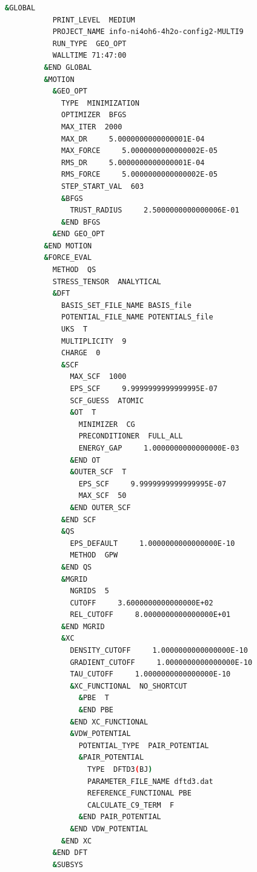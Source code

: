 \documentclass[12pt]{article}
\begin{document}
\begin{center}
    \lstset{numbers=left, basicstyle=\ttfamily, numbersep=-45pt}
    \begin{lstlisting}[language=bash]
        &GLOBAL
           PRINT_LEVEL  MEDIUM
           PROJECT_NAME info-ni4oh6-4h2o-config2-MULTI9
           RUN_TYPE  GEO_OPT
           WALLTIME 71:47:00
         &END GLOBAL
         &MOTION
           &GEO_OPT
             TYPE  MINIMIZATION
             OPTIMIZER  BFGS
             MAX_ITER  2000
             MAX_DR     5.0000000000000001E-04
             MAX_FORCE     5.0000000000000002E-05
             RMS_DR     5.0000000000000001E-04
             RMS_FORCE     5.0000000000000002E-05
             STEP_START_VAL  603
             &BFGS
               TRUST_RADIUS     2.5000000000000006E-01
             &END BFGS
           &END GEO_OPT
         &END MOTION
         &FORCE_EVAL
           METHOD  QS
           STRESS_TENSOR  ANALYTICAL
           &DFT
             BASIS_SET_FILE_NAME BASIS_file
             POTENTIAL_FILE_NAME POTENTIALS_file
             UKS  T
             MULTIPLICITY  9
             CHARGE  0
             &SCF
               MAX_SCF  1000
               EPS_SCF     9.9999999999999995E-07
               SCF_GUESS  ATOMIC
               &OT  T
                 MINIMIZER  CG
                 PRECONDITIONER  FULL_ALL
                 ENERGY_GAP     1.0000000000000000E-03
               &END OT
               &OUTER_SCF  T
                 EPS_SCF     9.9999999999999995E-07
                 MAX_SCF  50
               &END OUTER_SCF
             &END SCF
             &QS
               EPS_DEFAULT     1.0000000000000000E-10
               METHOD  GPW
             &END QS
             &MGRID
               NGRIDS  5
               CUTOFF     3.6000000000000000E+02
               REL_CUTOFF     8.0000000000000000E+01
             &END MGRID
             &XC
               DENSITY_CUTOFF     1.0000000000000000E-10
               GRADIENT_CUTOFF     1.0000000000000000E-10
               TAU_CUTOFF     1.0000000000000000E-10
               &XC_FUNCTIONAL  NO_SHORTCUT
                 &PBE  T
                 &END PBE
               &END XC_FUNCTIONAL
               &VDW_POTENTIAL
                 POTENTIAL_TYPE  PAIR_POTENTIAL
                 &PAIR_POTENTIAL
                   TYPE  DFTD3(BJ)
                   PARAMETER_FILE_NAME dftd3.dat
                   REFERENCE_FUNCTIONAL PBE
                   CALCULATE_C9_TERM  F
                 &END PAIR_POTENTIAL
               &END VDW_POTENTIAL
             &END XC
           &END DFT
           &SUBSYS

\end{lstlisting}
\end{center}
\end{document}
